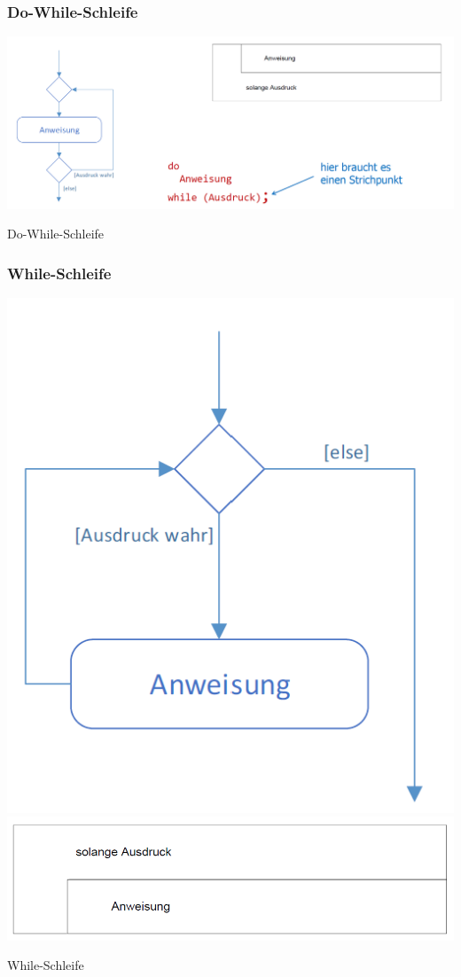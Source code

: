 		\subsubsection{Do-While-Schleife}
			\begin{minipage}{.45\linewidth}
				\includegraphics[width=0.95\linewidth]{Bilder/dowhile.png}
			\end{minipage}
			\hfill
			\begin{minipage}{.5\linewidth}
				Do-While-Schleife
			\end{minipage}

		\subsubsection{While-Schleife}
			\begin{minipage}{.45\linewidth}
				\includegraphics[width=0.5\linewidth]{Bilder/while1.png}
				\includegraphics[width=0.5\linewidth]{Bilder/while2.png}
			\end{minipage}
			\hfill
			\begin{minipage}{.5\linewidth}
				While-Schleife
			\end{minipage}

